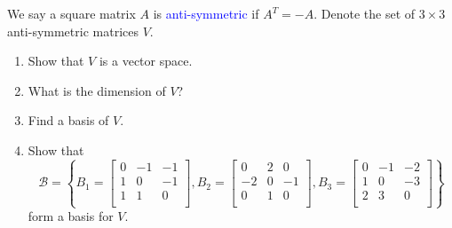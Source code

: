 \documentclass[a4paper,10pt]{article}
\begin{document}
\begin{problem}
We say a square matrix $A$ is \textcolor{blue}{anti-symmetric} if $A^T=-A$. Denote the set of $3\times3$ anti-symmetric matrices $V$.
\begin{enumerate}[label=\alph*)]
\item Show that $V$ is a vector space.
\item What is the dimension of $V$?
\item Find a basis of $V$.
\item Show that
\[
\mathcal B=\left\{B_1=\begin{bmatrix}
0&-1&-1\\
1&0&-1\\
1&1&0\\
\end{bmatrix},B_2=\begin{bmatrix}
0&2&0\\
-2&0&-1\\
0&1&0\\
\end{bmatrix},B_3=\begin{bmatrix}
0&-1&-2\\
1&0&-3\\
2&3&0\\
\end{bmatrix}\right\}
\]
form a basis for $V$.
\end{enumerate}
\end{problem}
\end{document}
